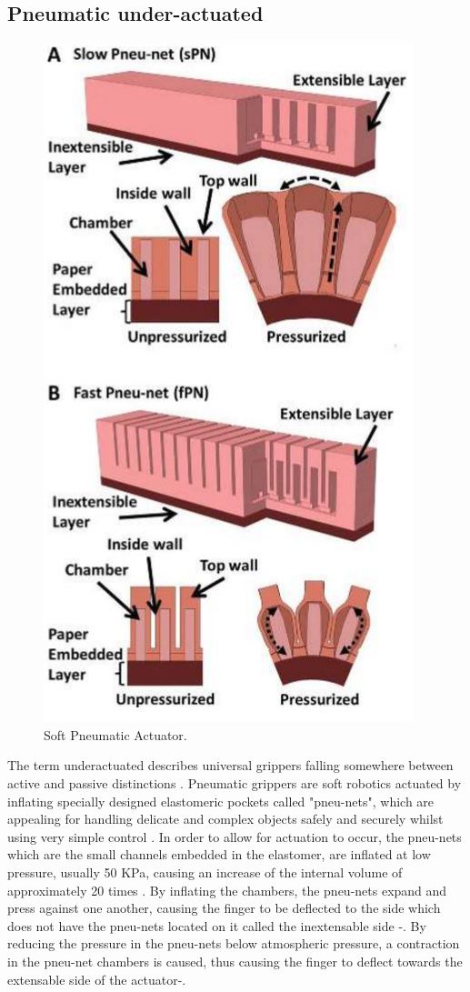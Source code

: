 \documentclass[11pt,twocolumn]{article}
\begin{document}
\subsection{Pneumatic under-actuated}
\begin{figure}[!h]
\centering
\includegraphics[scale=0.65]{Pneumatic1}
\caption{Soft Pneumatic Actuator.}
\label{pneumatic1}
\end{figure}
\noindent
The term underactuated describes universal grippers falling somewhere between active and passive distinctions \cite{amend2012positive}. Pneumatic grippers are soft robotics actuated by inflating specially designed elastomeric pockets called "pneu-nets", which are appealing for handling delicate and complex objects safely and securely whilst using very simple control \cite{mosadegh2014pneumatic}. In order to allow for actuation to occur, the pneu-nets which are the small channels embedded in the elastomer, are inflated at low pressure, usually 50 KPa, causing an increase of the internal volume of approximately 20 times \cite{mosadegh2014pneumatic}. By inflating the chambers, the pneu-nets expand and press against one another, causing the finger to be deflected to the side which does not have the pneu-nets located on it called the inextensable side \cite{ilievski2011soft}-\cite{marchese2015recipe}. By reducing the pressure in the pneu-nets below atmospheric pressure, a contraction in the pneu-net chambers is caused, thus causing the finger to deflect towards the extensable side of the actuator\cite{ilievski2011soft}-\cite{marchese2015recipe}.
\end{document}
